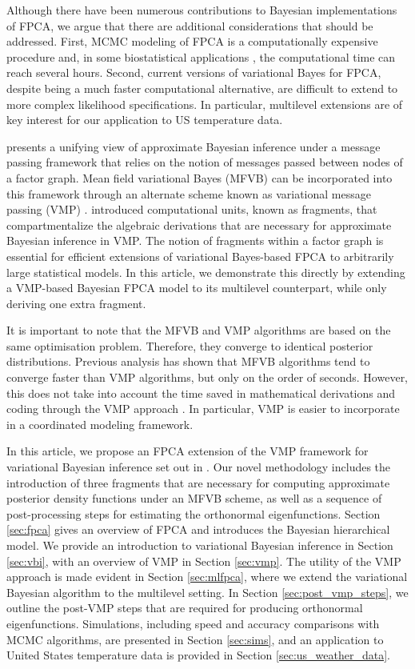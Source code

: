 \documentclass[ba]{imsart}
\numberwithin{equation}{section}
\theoremstyle{plain}
\begin{document}
Although there have been numerous contributions to Bayesian implementations of FPCA, we argue that there are
additional considerations that should be addressed. First, MCMC modeling of FPCA is a computationally expensive
procedure and, in some biostatistical applications \citep{Goldsmith15}, the computational time can reach several
hours. Second, current versions of variational Bayes for FPCA, despite being a much faster computational alternative,
are difficult to extend to more complex likelihood specifications. In particular, multilevel extensions are of key interest
for our application to US temperature data.

\citet{minka05} presents a unifying view of approximate Bayesian inference under a message passing framework
that relies on the notion of messages passed between nodes of a factor graph. Mean field variational Bayes (MFVB)
\citep{ormerod10, blei17}
can be incorporated into this framework through an alternate scheme known as variational message passing (VMP)
\citep{winn05}. \citet{wand17} introduced computational units, known as fragments, that compartmentalize
the algebraic derivations that are necessary for approximate Bayesian inference in VMP. The notion of fragments
within a factor graph is essential for efficient extensions of variational Bayes-based FPCA to arbitrarily large statistical
models. In this article, we demonstrate this directly by extending a VMP-based Bayesian FPCA model to its
multilevel counterpart, while only deriving one extra fragment.

It is important to note that the MFVB and VMP algorithms are based on the same optimisation problem. Therefore,
they converge to identical posterior distributions. Previous analysis
\citep{nolanphd20} has shown that MFVB algorithms tend to converge faster than VMP algorithms, but only on the
order of seconds. However, this does not take into account the time saved in mathematical derivations and coding
through the VMP approach \citep{wand17}. In particular, VMP is easier to incorporate in a coordinated modeling
framework.

In this article, we propose an FPCA extension of the VMP framework for variational Bayesian inference set out in
\citet{wand17}. Our novel methodology includes the introduction of three fragments  that are necessary for
computing approximate posterior density functions under an MFVB scheme,
as well as a sequence of post-processing steps for estimating the orthonormal eigenfunctions.
Section \ref{sec:fpca} gives an overview of FPCA and
introduces the Bayesian hierarchical model.
We provide an introduction to
variational Bayesian inference in Section \ref{sec:vbi}, with an overview of VMP in Section \ref{sec:vmp}.
The utility of the VMP approach is made evident in Section \ref{sec:mlfpca}, where we extend the variational
Bayesian algorithm to the multilevel setting.
In Section \ref{sec:post_vmp_steps}, we outline the post-VMP steps that are required for
producing orthonormal eigenfunctions. Simulations, including speed and accuracy comparisons with MCMC
algorithms, are presented in Section \ref{sec:sims}, and an application to United States temperature data is
provided in Section \ref{sec:us_weather_data}.
\end{document}

